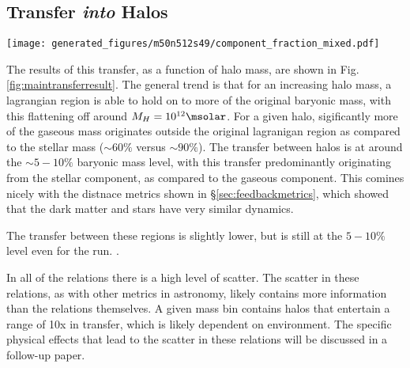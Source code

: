 \subsection{Transfer \emph{into} Halos}

\begin{figure*}
	\centering
	\texttt{[image: generated\_figures/m50n512s49/component\_fraction\_mixed.pdf]}
	\caption{
		The fraction of baryonic mass originating from each lagrangian component is
		shown as a function of redshift $z=0$ halo mass. {\textit {Left:}} baryonic
		mass, {\textit {center:}} gas mass, and {\textit {right:}} stellar mass. Shaded
		regions show the scatter in a given bin, with one standard deviation of variation
		being shown.
	}
	\label{fig:maintransferresult}
\end{figure*}

The results of this transfer, as a function of halo mass, are shown in Fig.
\ref{fig:maintransferresult}. The general trend is that for an increasing halo mass,
a lagrangian region is able to hold on to more of the original baryonic mass, with
this flattening off around $M_H = 10^{12} \msolar$. For a given halo, sigificantly
more of the gaseous mass originates outside the original lagranigan region as compared
to the stellar mass ($\sim 60 \%$ versus $\sim 90 \%$). The transfer between halos is
at around the $\sim 5-10\%$ baryonic mass level, with this transfer predominantly
originating from the stellar component, as compared to the gaseous component. This comines
nicely with the distnace metrics shown in \S \ref{sec:feedbackmetrics}, which
showed that the dark matter and stars have very similar dynamics.

The transfer between these regions is slightly lower, but is still at the $5-10\%$ level
even for the \nojet{} run. .


In all of the relations there is a high level of scatter. The scatter in these
relations, as with other metrics in astronomy, likely contains more information 
than the relations themselves. A given mass bin contains halos that entertain a range
of 10x in transfer, which is likely dependent on environment. The specific physical
effects that lead to the scatter in these relations will be discussed in a follow-up
paper.

